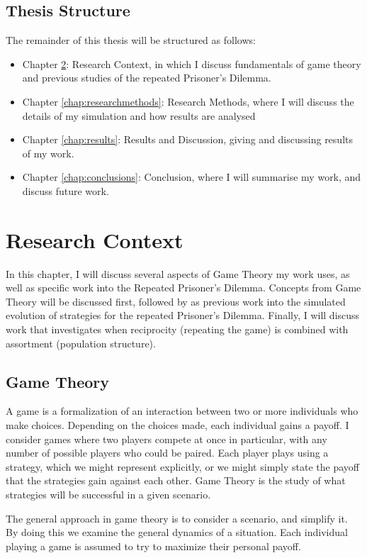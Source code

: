 \documentclass[a4paper,11pt,bcshonoursthesis,singlespace,oneside,thesisdraft,pdflatex]{cssethesis}
\begin{document}
\section{Thesis Structure}
The remainder of this thesis will be structured as follows:
\begin{itemize}
\item Chapter \ref{chap:researchcontext}: Research Context, in which I discuss fundamentals of game theory and previous studies of the repeated Prisoner's Dilemma.
\item Chapter \ref{chap:researchmethods}: Research Methods, where I will discuss the details of my simulation and how results are analysed
\item Chapter \ref{chap:results}: Results and Discussion, giving and discussing results of my work.
\item Chapter \ref{chap:conclusions}: Conclusion, where I will summarise my work, and discuss future work.
\end{itemize}

\chapter{Research Context}
\label{chap:researchcontext}
In this chapter, I will discuss several aspects of Game Theory my work uses, as well as specific work into the Repeated Prisoner's Dilemma. 
Concepts from Game Theory will be discussed first, followed by as previous work into the simulated evolution of strategies for the repeated Prisoner's Dilemma. 
Finally, I will discuss work that investigates when reciprocity (repeating the game) is combined with assortment (population structure).
\section{Game Theory}
A game is a formalization of an interaction between two or more individuals who make choices. 
Depending on the choices made, each individual gains a payoff.  
I consider games where two players compete at once in particular, with any number of possible players who could be paired. 
Each player plays using a strategy, which we might represent explicitly, or we might simply state the payoff that the strategies gain against each other. 
Game Theory is the study of what strategies will be successful in a given scenario. 

The general approach in game theory is to consider a scenario, and simplify it. 
By doing this we examine the general dynamics of a situation. 
Each individual playing a game is assumed to try to maximize their personal payoff. 
\end{document}
